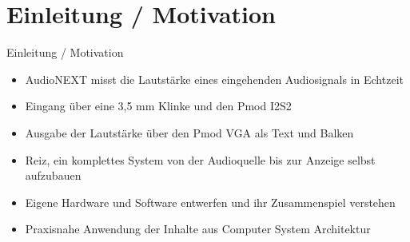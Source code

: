 \section{Einleitung / Motivation}
\begin{frame}{Einleitung / Motivation}
    \begin{itemize}
        \item AudioNEXT misst die Lautstärke eines eingehenden Audiosignals in Echtzeit
        \item Eingang über eine 3,5 mm Klinke und den Pmod I2S2
        \item Ausgabe der Lautstärke über den Pmod VGA als Text und Balken
        \item Reiz, ein komplettes System von der Audioquelle bis zur Anzeige selbst aufzubauen
        \item Eigene Hardware und Software entwerfen und ihr Zusammenspiel verstehen
        \item Praxisnahe Anwendung der Inhalte aus Computer System Architektur
    \end{itemize}
\end{frame}
